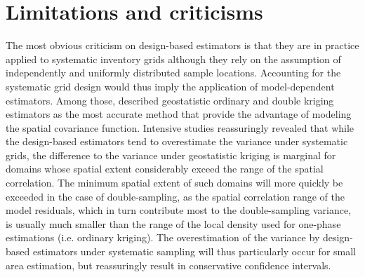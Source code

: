 
\section{Limitations and criticisms}
\label{sec:synth:limits}

The most obvious criticism on design-based estimators is that they are in practice applied to systematic inventory grids although they rely on the assumption of independently and uniformly distributed sample locations. Accounting for the systematic grid design would thus imply the application of model-dependent estimators. Among those, \citet{mandallaz1993} described geostatistic ordinary and double kriging estimators as the most accurate method that provide the advantage of modeling the spatial covariance function. Intensive studies reassuringly revealed that while the design-based estimators tend to overestimate the variance under systematic grids, the difference to the variance under geostatistic kriging is marginal for domains whose spatial extent considerably exceed the range of the spatial correlation. The minimum spatial extent of such domains will more quickly be exceeded in the case of double-sampling, as the spatial correlation range of the model residuals, which in turn contribute most to the double-sampling variance, is usually much smaller than the range of the local density used for one-phase estimations (i.e. ordinary kriging). The overestimation of the variance by design-based estimators under systematic sampling will thus particularly occur for small area estimation, but reassuringly result in conservative confidence intervals.\par


